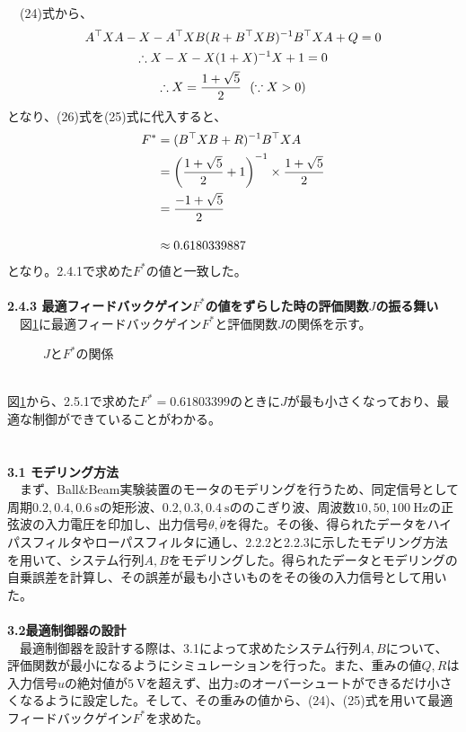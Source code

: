 \documentclass[a4paper,10.5pt]{ltjsarticle}
\begin{document}
　(24)式から、
\begin{gather}
  A^\top XA-X-A^\top XB(R+B^\top XB)^{-1}B^\top XA+Q=0\notag \\
  \therefore X-X-X(1+X)^{-1}X+1=0\notag \\
  \therefore X=\frac{1+\sqrt{5}}{2}\ \ (\because X>0)
\end{gather}
となり、(26)式を(25)式に代入すると、
\begin{align}
  F^*&=(B^\top XB+R)^{-1}B^\top XA\notag\\
  &=\left(\frac{1+\sqrt{5}}{2}+1\right)^{-1}\times \frac{1+\sqrt{5}}{2}\notag\\
  &=\frac{-1+\sqrt{5}}{2}\notag\\[10pt]
  &\approx 0.6180339887
\end{align}
となり。2.4.1で求めた$F^*$の値と一致した。\\
\\
{\large \bfseries 2.4.3 最適フィードバックゲイン$F^*$の値をずらした時の評価関数$J$の振る舞い}\\
　図\ref{fig:figure5}に最適フィードバックゲイン$F^*$と評価関数$J$の関係を示す。
\begin{figure}[h]
  \centering
  
  \vspace{-30pt}\caption{$J$と$F^*$の関係}
  \label{fig:figure5}
\end{figure}
\\
図\ref{fig:figure5}から、2.5.1で求めた$F^*=0.61803399$のときに$J$が最も小さくなっており、最適な制御ができていることがわかる。\\
\\
\hspace{-2pt}{\Large \bfseries 3.実験方法}\\
{\large \bfseries 3.1 モデリング方法}\\
　まず、Ball\&Beam実験装置のモータのモデリングを行うため、同定信号として周期$0.2,0.4,0.6\ \mathrm{s}$の矩形波、$0.2,0.3,0.4\ \mathrm{s}$ののこぎり波、周波数$10,50,100\ \mathrm{Hz}$の正弦波の入力電圧を印加し、出力信号$\theta,\dot{\theta}$を得た。その後、得られたデータをハイパスフィルタやローパスフィルタに通し、2.2.2と2.2.3に示したモデリング方法を用いて、システム行列$A,B$をモデリングした。得られたデータとモデリングの自乗誤差を計算し、その誤差が最も小さいものをその後の入力信号として用いた。\\
\\
{\large \bfseries 3.2最適制御器の設計}\\
　最適制御器を設計する際は、3.1によって求めたシステム行列$A,B$について、評価関数が最小になるようにシミュレーションを行った。また、重みの値$Q,R$は入力信号$u$の絶対値が$5\ \mathrm{V}$を超えず、出力$z$のオーバーシュートができるだけ小さくなるように設定した。そして、その重みの値から、(24)、(25)式を用いて最適フィードバックゲイン$F^*$を求めた。\\
\end{document}
